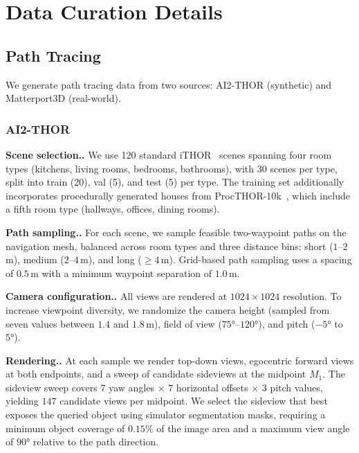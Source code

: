 \documentclass{llmxive}
\providecommand{\paragraph}[1]{\vspace{.5em}\noindent\textbf{#1.}}
\begin{document}
\section{Data Curation Details}
\label{supp_data}

\subsection{Path Tracing}
\label{supp_data_pt}

We generate path tracing data from two sources: AI2-THOR (synthetic) and Matterport3D (real-world).

\subsubsection{AI2-THOR}

\paragraph{Scene selection.}
We use 120 standard iTHOR~\cite{kolve2017ai2} scenes spanning four room types (kitchens, living rooms, bedrooms, bathrooms), with 30 scenes per type, split into train (20), val (5), and test (5) per type.
The training set additionally incorporates procedurally generated houses from ProcTHOR-10k~\cite{deitke2022procthor}, which include a fifth room type (hallways, offices, dining rooms).

\paragraph{Path sampling.}
For each scene, we sample feasible two-waypoint paths on the navigation mesh, balanced across room types and three distance bins: short ($1$--$2$\,m), medium ($2$--$4$\,m), and long (${\geq}4$\,m).
Grid-based path sampling uses a spacing of $0.5$\,m with a minimum waypoint separation of $1.0$\,m.

\paragraph{Camera configuration.}
All views are rendered at $1024 \times 1024$ resolution.
To increase viewpoint diversity, we randomize the camera height (sampled from seven values between $1.4$ and $1.8$\,m), field of view ($75°$--$120°$), and pitch ($-5°$ to $5°$).

\paragraph{Rendering.}
At each sample we render top-down views, egocentric forward views at both endpoints, and a sweep of candidate sideviews at the midpoint $M_1$.
The sideview sweep covers $7$ yaw angles $\times$ $7$ horizontal offsets $\times$ $3$ pitch values, yielding $147$ candidate views per midpoint.
We select the sideview that best exposes the queried object using simulator segmentation masks, requiring a minimum object coverage of $0.15\%$ of the image area and a maximum view angle of $90°$ relative to the path direction.
\end{document}
